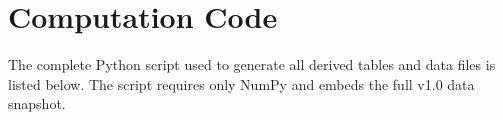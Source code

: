 \section{Computation Code}\label{app:code}

The complete Python script used to generate all derived tables and
data files is listed below.  The script requires only NumPy and
embeds the full {\ISI} v1.0 data snapshot.



